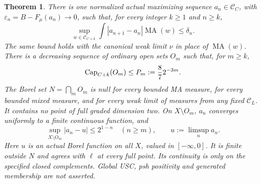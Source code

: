 \documentclass[11pt]{article}
\newtheorem{theorem}{Theorem}
\newcommand{\MA}{\operatorname{MA}}
\newcommand{\C}{\mathcal C}
\begin{document}
\begin{theorem}\label{new:diagonal}
There is one normalized actual maximizing sequence $a_n\in\C_C$,
with $\varepsilon_n=B-F_\mu(a_n)\to0$, such that, for every integer
$k\ge1$ and $n\ge k$,
\begin{equation}\label{new:increment}
 \sup_{w\in\C_{C+k}}\int|a_{n+1}-a_n|\MA(w)\le\delta_n.
\end{equation}
The same bound holds with the canonical weak limit $\nu$ in place of
$\MA(w)$. There is a decreasing sequence of ordinary open sets $O_m$
such that, for $m\ge k$,
\begin{equation}\label{new:capacity}
 \operatorname{Cap}_{C+k}(O_m)\le P_m:={8\over7}2^{-3m}.
\end{equation}
The Borel set $N=\bigcap_mO_m$ is null for every bounded MA measure,
for every bounded mixed measure, and for every weak limit of measures
from any fixed $\C_L$. It contains no point of full graded dimension
two. On $X\setminus O_m$, $a_n$ converges uniformly to a finite
continuous function, and
\[
 \sup_{X\setminus O_m}|a_n-u|\le 2^{1-n}\quad(n\ge m),
 \qquad u:=\limsup_n a_n.
\]
Here $u$ is an actual Borel function on all $X$, valued in $[-\infty,0]$.
It is finite outside $N$ and agrees with $\ell$ at every full point.
Its continuity is only on the specified closed complements. Global
USC, psh positivity and generated membership are not asserted.
\end{theorem}
\end{document}

